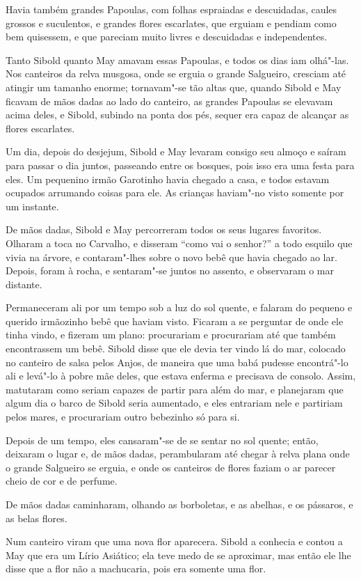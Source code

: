 Havia também grandes Papoulas, com folhas espraiadas e descuidadas,
caules grossos e suculentos, e grandes flores escarlates, que erguiam e
pendiam como bem quisessem, e que pareciam muito livres e descuidadas e
independentes.

Tanto Sibold quanto May amavam essas Papoulas, e todos os dias iam
olhá"-las. Nos canteiros da relva musgosa, onde se erguia o grande
Salgueiro, cresciam até atingir um tamanho enorme; tornavam"-se tão
altas que, quando Sibold e May ficavam de mãos dadas ao lado do
canteiro, as grandes Papoulas se elevavam acima deles, e Sibold, subindo
na ponta dos pés, sequer era capaz de alcançar as flores escarlates.

Um dia, depois do desjejum, Sibold e May levaram consigo seu almoço e
saíram para passar o dia juntos, passeando entre os bosques, pois isso
era uma festa para eles. Um pequenino irmão Garotinho havia chegado a
casa, e todos estavam ocupados arrumando coisas para ele. As crianças
haviam"-no visto somente por um instante.

De mãos dadas, Sibold e May percorreram todos os seus lugares favoritos.
Olharam a toca no Carvalho, e disseram ``como vai o senhor?'' a todo
esquilo que vivia na árvore, e contaram"-lhes sobre o novo bebê que havia
chegado ao lar. Depois, foram à rocha, e sentaram"-se juntos no assento,
e observaram o mar distante.

Permaneceram ali por um tempo sob a luz do sol quente, e falaram do
pequeno e querido irmãozinho bebê que haviam visto. Ficaram a se
perguntar de onde ele tinha vindo, e fizeram um plano: procurariam e
procurariam até que também encontrassem um bebê. Sibold disse que
ele devia ter vindo lá do mar, colocado no canteiro de salsa pelos
Anjos, de maneira que uma babá pudesse encontrá"-lo ali e levá"-lo à pobre
mãe deles, que estava enferma e precisava de consolo. Assim,
matutaram como seriam capazes de partir para além do mar, e planejaram
que algum dia o barco de Sibold seria aumentado, e eles entrariam nele e
partiriam pelos mares, e procurariam outro bebezinho só para si.

Depois de um tempo, eles cansaram"-se de se sentar no sol quente; então,
deixaram o lugar e, de mãos dadas, perambularam até chegar à relva plana
onde o grande Salgueiro se erguia, e onde os canteiros de flores faziam
o ar parecer cheio de cor e de perfume.

De mãos dadas caminharam, olhando as borboletas, e as abelhas, e os
pássaros, e as belas flores.

Num canteiro viram que uma nova flor aparecera. Sibold a conhecia e
contou a May que era um Lírio Asiático; ela teve medo de se aproximar,
mas então ele lhe disse que a flor não a machucaria, pois era somente
uma flor.

